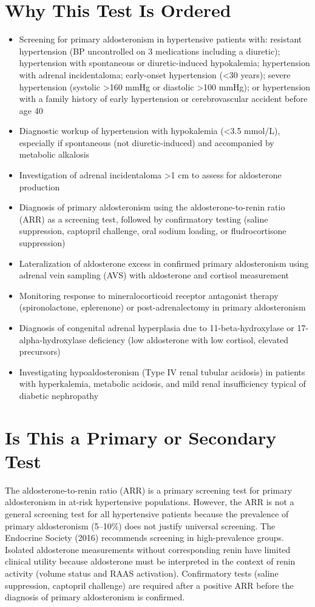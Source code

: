 \section*{Why This Test Is Ordered}
\begin{itemize}
  \item Screening for primary aldosteronism in hypertensive patients with: resistant hypertension (BP uncontrolled on 3 medications including a diuretic); hypertension with spontaneous or diuretic-induced hypokalemia; hypertension with adrenal incidentaloma; early-onset hypertension (<30 years); severe hypertension (systolic >160 mmHg or diastolic >100 mmHg); or hypertension with a family history of early hypertension or cerebrovascular accident before age 40
  \item Diagnostic workup of hypertension with hypokalemia (<3.5 mmol/L), especially if spontaneous (not diuretic-induced) and accompanied by metabolic alkalosis
  \item Investigation of adrenal incidentaloma >1 cm to assess for aldosterone production
  \item Diagnosis of primary aldosteronism using the aldosterone-to-renin ratio (ARR) as a screening test, followed by confirmatory testing (saline suppression, captopril challenge, oral sodium loading, or fludrocortisone suppression)
  \item Lateralization of aldosterone excess in confirmed primary aldosteronism using adrenal vein sampling (AVS) with aldosterone and cortisol measurement
  \item Monitoring response to mineralocorticoid receptor antagonist therapy (spironolactone, eplerenone) or post-adrenalectomy in primary aldosteronism
  \item Diagnosis of congenital adrenal hyperplasia due to 11-beta-hydroxylase or 17-alpha-hydroxylase deficiency (low aldosterone with low cortisol, elevated precursors)
  \item Investigating hypoaldosteronism (Type IV renal tubular acidosis) in patients with hyperkalemia, metabolic acidosis, and mild renal insufficiency typical of diabetic nephropathy
\end{itemize}

\section*{Is This a Primary or Secondary Test}
The aldosterone-to-renin ratio (ARR) is a primary screening test for primary aldosteronism in at-risk hypertensive populations. However, the ARR is not a general screening test for all hypertensive patients because the prevalence of primary aldosteronism (5--10\%) does not justify universal screening. The Endocrine Society (2016) recommends screening in high-prevalence groups. Isolated aldosterone measurements without corresponding renin have limited clinical utility because aldosterone must be interpreted in the context of renin activity (volume status and RAAS activation). Confirmatory tests (saline suppression, captopril challenge) are required after a positive ARR before the diagnosis of primary aldosteronism is confirmed.

